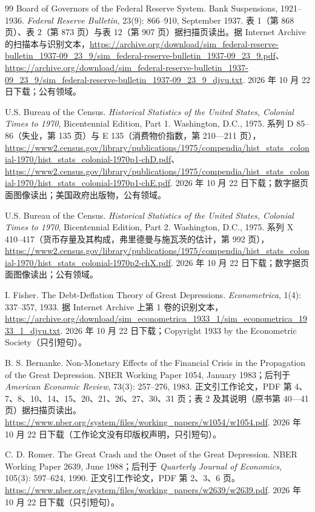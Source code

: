 \begin{thebibliography}{99}
 Board of Governors of the Federal Reserve System. Bank Suspensions, 1921--1936. \emph{Federal Reserve Bulletin}, 23(9): 866--910, September 1937. 表 1（第 868 页）、表 2（第 873 页）与表 12（第 907 页）据扫描页读出。据 Internet Archive 的扫描本与识别文本，\url{https://archive.org/download/sim_federal-reserve-bulletin_1937-09_23_9/sim_federal-reserve-bulletin_1937-09_23_9.pdf}、\url{https://archive.org/download/sim_federal-reserve-bulletin_1937-09_23_9/sim_federal-reserve-bulletin_1937-09_23_9_djvu.txt}. 2026 年 10 月 22 日下载；公有领域。

 U.S. Bureau of the Census. \emph{Historical Statistics of the United States, Colonial Times to 1970}, Bicentennial Edition, Part 1. Washington, D.C., 1975. 系列 D 85--86（失业，第 135 页）与 E 135（消费物价指数，第 210—211 页），\url{https://www2.census.gov/library/publications/1975/compendia/hist_stats_colonial-1970/hist_stats_colonial-1970p1-chD.pdf}、\url{https://www2.census.gov/library/publications/1975/compendia/hist_stats_colonial-1970/hist_stats_colonial-1970p1-chE.pdf}. 2026 年 10 月 22 日下载；数字据页面图像读出；美国政府出版物，公有领域。

 U.S. Bureau of the Census. \emph{Historical Statistics of the United States, Colonial Times to 1970}, Bicentennial Edition, Part 2. Washington, D.C., 1975. 系列 X 410--417（货币存量及其构成，弗里德曼与施瓦茨的估计，第 992 页），\url{https://www2.census.gov/library/publications/1975/compendia/hist_stats_colonial-1970/hist_stats_colonial-1970p2-chX.pdf}. 2026 年 10 月 22 日下载；数字据页面图像读出；公有领域。

 I. Fisher. The Debt-Deflation Theory of Great Depressions. \emph{Econometrica}, 1(4): 337--357, 1933. 据 Internet Archive 上第 1 卷的识别文本，\url{https://archive.org/download/sim_econometrica_1933_1/sim_econometrica_1933_1_djvu.txt}. 2026 年 10 月 22 日下载；Copyright 1933 by the Econometric Society（只引短句）。

 B. S. Bernanke. Non-Monetary Effects of the Financial Crisis in the Propagation of the Great Depression. NBER Working Paper 1054, January 1983；后刊于 \emph{American Economic Review}, 73(3): 257--276, 1983. 正文引工作论文，PDF 第 4、7、8、10、14、15、20、21、26、27、30、31 页；表 2 及其说明（原书第 40—41 页）据扫描页读出。\url{https://www.nber.org/system/files/working_papers/w1054/w1054.pdf}. 2026 年 10 月 22 日下载（工作论文没有印版权声明，只引短句）。

 C. D. Romer. The Great Crash and the Onset of the Great Depression. NBER Working Paper 2639, June 1988；后刊于 \emph{Quarterly Journal of Economics}, 105(3): 597--624, 1990. 正文引工作论文，PDF 第 2、3、6 页。\url{https://www.nber.org/system/files/working_papers/w2639/w2639.pdf}. 2026 年 10 月 22 日下载（只引短句）。


\end{thebibliography}
